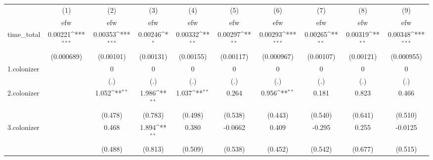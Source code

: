 {
\def\sym#1{\ifmmode^{#1}\else\(^{#1}\)\fi}
\begin{tabular}{l*{9}{c}}
\hline\hline
            &\multicolumn{1}{c}{(1)}&\multicolumn{1}{c}{(2)}&\multicolumn{1}{c}{(3)}&\multicolumn{1}{c}{(4)}&\multicolumn{1}{c}{(5)}&\multicolumn{1}{c}{(6)}&\multicolumn{1}{c}{(7)}&\multicolumn{1}{c}{(8)}&\multicolumn{1}{c}{(9)}\\
            &\multicolumn{1}{c}{efw}&\multicolumn{1}{c}{efw}&\multicolumn{1}{c}{efw}&\multicolumn{1}{c}{efw}&\multicolumn{1}{c}{efw}&\multicolumn{1}{c}{efw}&\multicolumn{1}{c}{efw}&\multicolumn{1}{c}{efw}&\multicolumn{1}{c}{efw}\\
\hline
time\_total  &     0.00221\sym{***}&     0.00353\sym{***}&     0.00246\sym{*}  &     0.00332\sym{**} &     0.00297\sym{**} &     0.00293\sym{***}&     0.00265\sym{**} &     0.00319\sym{**} &     0.00348\sym{***}\\
            &  (0.000689)         &   (0.00101)         &   (0.00131)         &   (0.00155)         &   (0.00117)         &  (0.000967)         &   (0.00107)         &   (0.00121)         &  (0.000955)         \\
[1em]
1.colonizer &                     &           0         &           0         &           0         &           0         &           0         &           0         &           0         &           0         \\
            &                     &         (.)         &         (.)         &         (.)         &         (.)         &         (.)         &         (.)         &         (.)         &         (.)         \\
[1em]
2.colonizer &                     &       1.052\sym{**} &       1.986\sym{**} &       1.037\sym{**} &       0.264         &       0.956\sym{**} &       0.181         &       0.823         &       0.466         \\
            &                     &     (0.478)         &     (0.783)         &     (0.498)         &     (0.538)         &     (0.443)         &     (0.540)         &     (0.641)         &     (0.510)         \\
[1em]
3.colonizer &                     &       0.468         &       1.894\sym{**} &       0.380         &     -0.0662         &       0.409         &      -0.295         &       0.255         &     -0.0125         \\
            &                     &     (0.488)         &     (0.813)         &     (0.509)         &     (0.538)         &     (0.452)         &     (0.542)         &     (0.677)         &     (0.515)         \\

\end{tabular}}
